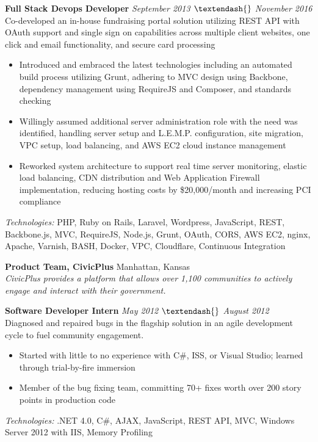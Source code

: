 \documentclass[10pt]{article}
\begin{document}
\begin{addmargin}[1em]{0em}
  \textbf{Full Stack Devops Developer} \hfill \textit{September 2013 $\textendash{}$ November 2016} \\
  Co-developed an in-house fundraising portal solution utilizing REST API with OAuth support and single sign on capabilities across multiple client websites, one click and email functionality, and secure card processing \\
  \vspace{-1em}
  \begin{itemize}
    \item Introduced and embraced the latest technologies including an automated build process utilizing Grunt, adhering to MVC design using Backbone, dependency management using RequireJS and Composer, and standards checking
    \item Willingly assumed additional server administration role with the need was identified, handling server setup and L.E.M.P. configuration, site migration, VPC setup, load balancing, and AWS EC2 cloud instance management
    \item Reworked system architecture to support real time server monitoring, elastic load balancing, CDN distribution and Web Application Firewall implementation, reducing hosting costs by \$20,000/month and increasing PCI compliance
  \end{itemize}
  \textit{Technologies:} PHP, Ruby on Rails, Laravel, Wordpress, JavaScript, REST, Backbone.js, MVC, RequireJS, Node.js, Grunt, OAuth, CORS, AWS EC2, nginx, Apache, Varnish, BASH, Docker, VPC, Cloudflare, Continuous Integration
\end{addmargin}
\textbf{Product Team, CivicPlus} \hfill Manhattan, Kansas \\
\textit{CivicPlus provides a platform that allows over 1,100 communities to actively engage and interact with their government.} \\
\begin{addmargin}[1em]{0em}
  \textbf{Software Developer Intern} \hfill \textit{May 2012 $\textendash{}$ August 2012} \\
  Diagnosed and repaired bugs in the flagship solution in an agile development cycle to fuel community engagement. \\
  \vspace{-1em}
  \begin{itemize}
    \item Started with little to no experience with C\#, ISS, or Visual Studio; learned through trial-by-fire immersion
    \item Member of the bug fixing team, committing 70+ fixes worth over 200 story points in production code
  \end{itemize}
  \textit{Technologies:} .NET 4.0, C\#, AJAX, JavaScript, REST API, MVC, Windows Server 2012 with IIS, Memory Profiling
\end{addmargin}
\end{document}
